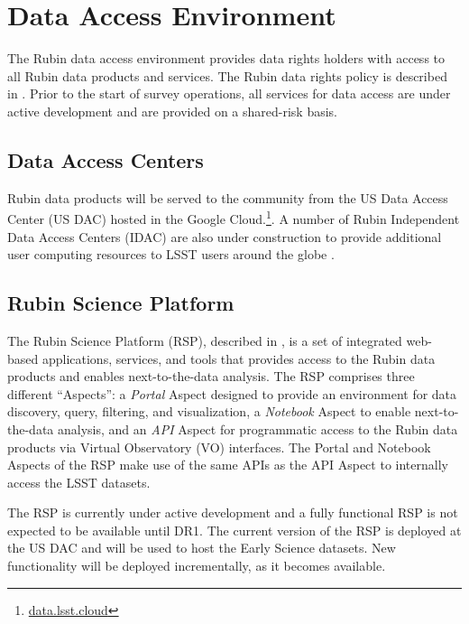 \section{Data Access Environment} \label{access}

The Rubin data access environment provides data rights holders with access to all Rubin data products and services.
The Rubin data rights policy is described in .
Prior to the start of survey operations, all services for data access are under active development and are provided on a shared-risk basis.

\subsection{Data Access Centers}

Rubin data products will be served to the community from the US Data Access Center (US DAC) hosted in the Google Cloud.\footnote{\url{data.lsst.cloud}}.
A number of Rubin Independent Data Access Centers (IDAC) are also under construction to provide additional user computing resources to LSST users around the globe .

\subsection{Rubin Science Platform}
\label{ssec:rsp}
The Rubin Science Platform (RSP), described in , is a set of integrated web-based applications, services, and tools that provides access to the Rubin data products and enables next-to-the-data analysis.
The RSP comprises three different ``Aspects'': a \emph{Portal} Aspect designed to provide an environment for data discovery, query, filtering, and visualization, a \emph{Notebook} Aspect to enable next-to-the-data analysis, and an \emph{API} Aspect for programmatic access to the Rubin data products via Virtual Observatory (VO) interfaces.
The Portal and Notebook Aspects of the RSP make use of the same APIs as the API Aspect to internally access the LSST datasets.

The RSP is currently under active development and a fully functional RSP is not expected to be available until DR1.
The current version of the RSP is deployed at the US DAC and will be used to host the Early Science datasets.
New functionality will be deployed incrementally, as it becomes available.

